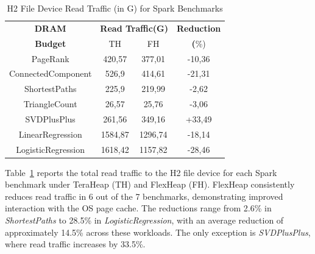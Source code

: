 \begin{table}[h]
\centering
\caption{H2 File Device Read Traffic (in G) for Spark Benchmarks}
\label{tab:spark-h2-traffic}
\begin{tabular}{|c|cc|c|}
\hline
\textbf{DRAM} & \multicolumn{2}{c|}{\textbf{Read Traffic(G)}} & \textbf{Reduction} \\
\textbf{Budget} & TH & FH & \textbf(\%)\\
\hline
        PageRank              & 420,57  & 377,01 & -10,36 \\
        ConnectedComponent    & 526,9  & 414,61  & -21,31 \\
        ShortestPaths         & 225,9  & 219,99 & -2,62 \\
        TriangleCount         & 26,57  & 25,76  & -3,06 \\
        SVDPlusPlus           & 261,56  & 349,16 & +33,49 \\
        LinearRegression      & 1584,87  & 1296,74 & -18,14 \\
        LogisticRegression    & 1618,42 & 1157,82 & -28,46 \\
\hline
\end{tabular}
\end{table}


Table~\ref{tab:spark-h2-traffic} reports the total read traffic to the H2 file device for each Spark benchmark under
TeraHeap (TH) and FlexHeap (FH). FlexHeap consistently reduces read traffic in 6 out of the 7 benchmarks,
demonstrating improved interaction with the OS page cache. The reductions range from 2.6\% in \textit{ShortestPaths}
to 28.5\% in \textit{LogisticRegression}, with an average reduction of approximately 14.5\% across these workloads.
The only exception is \textit{SVDPlusPlus}, where read traffic increases by 33.5\%. 



